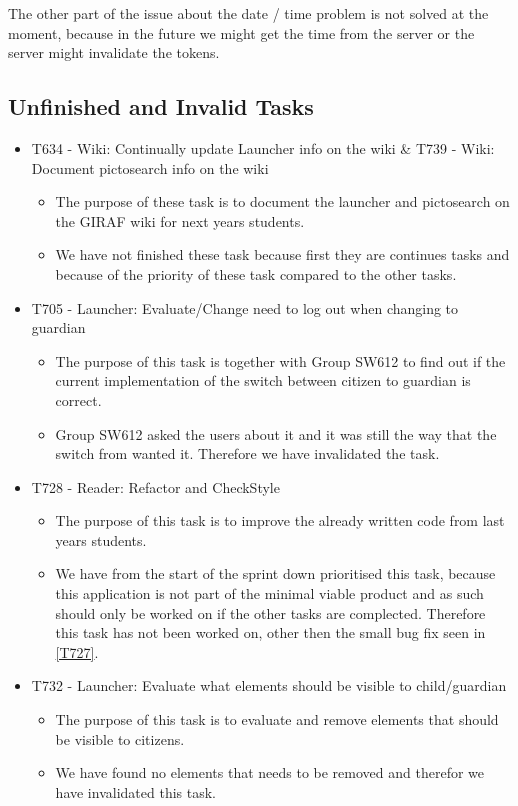 The other part of the issue about the date / time problem is not solved at the
moment, because in the future we might get the time from the server or the server
might invalidate the tokens.


\subsection{Unfinished and Invalid Tasks}
\begin{itemize}
  \item T634 - Wiki: Continually update Launcher info on the wiki \& T739 -
  Wiki: Document pictosearch info on the wiki
  \begin{itemize}
  	\item The purpose of these task is to document the launcher and pictosearch
  	on the GIRAF wiki for next years students. 
  	\item We have not finished these task because first they are continues tasks
  	and because of the priority of these task compared to the other tasks.
  \end{itemize}
  \item T705 - Launcher: Evaluate/Change need to log out when changing  to
  guardian
  \begin{itemize}
  	\item The purpose of this task is together with Group SW612 to find out if
  	the current implementation of the switch between citizen to guardian is
  	correct. 
  	\item Group SW612 asked the users about it and it was still the way that the
  	switch from  wanted it. Therefore we have invalidated the task.
  \end{itemize}
  \item T728 - Reader: Refactor and CheckStyle
    \begin{itemize}
  	\item The purpose of this task is to improve the already written code from
  	last years students. 
  	\item We have from the start of the sprint down prioritised this task,
  	because this application is not part of the minimal viable product and as
  	such should only be worked on if the other tasks are complected. Therefore
  	this task has not been worked on, other then the small bug fix seen in
  	\autoref{T727}.
  \end{itemize}
  \item T732 - Launcher: Evaluate what elements should be visible to
child/guardian
  \begin{itemize}
  	\item The purpose of this task is to evaluate and remove elements that should
  	be visible to citizens.
  	\item We have found no elements that needs to be removed and therefor we have
  	invalidated this task.
  \end{itemize}
\end{itemize}





















